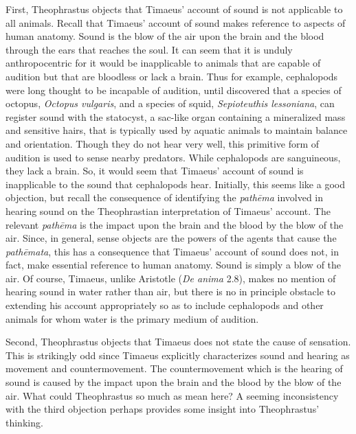 First, Theophrastus objects that Timaeus' account of sound is not applicable to all animals. Recall that Timaeus' account of sound makes reference to aspects of human anatomy. Sound is the blow of the air upon the brain and the blood through the ears that reaches the soul. It can seem that it is unduly anthropocentric for it would be inapplicable to animals that are capable of audition but that are bloodless or lack a brain. Thus for example, cephalopods were long thought to be incapable of audition, until \citet{Hu:2009ov} discovered that a species of octopus, \emph{Octopus vulgaris}, and a species of squid, \emph{Sepioteuthis lessoniana}, can register sound with the statocyst, a sac-like organ containing a mineralized mass and sensitive hairs, that is typically used by aquatic animals to maintain balance and orientation. Though they do not hear very well, this primitive form of audition is used to sense nearby predators. While cephalopods are sanguineous, they lack a brain. So, it would seem that Timaeus' account of sound is inapplicable to the sound that cephalopods hear. Initially, this seems like a good objection, but recall the consequence of identifying the \emph{pathēma} involved in hearing sound on the Theophrastian interpretation of Timaeus' account. The relevant \emph{pathēma} is the impact upon the brain and the blood by the blow of the air. Since, in general, sense objects are the powers of the agents that cause the \emph{pathēmata}, this has a consequence that Timaeus' account of sound does not, in fact, make essential reference to human anatomy. Sound is simply a blow of the air. Of course, Timaeus, unlike Aristotle (\emph{De anima} 2.8), makes no mention of hearing sound in water rather than air, but there is no in principle obstacle to extending his account appropriately so as to include cephalopods and other animals for whom water is the primary medium of audition.

Second, Theophrastus objects that Timaeus does not state the cause of sensation. This is strikingly odd since Timaeus explicitly characterizes sound and hearing as movement and countermovement. The countermovement which is the hearing of sound is caused by the impact upon the brain and the blood by the blow of the air. What could Theophrastus so much as mean here? A seeming inconsistency with the third objection perhaps provides some insight into Theophrastus' thinking.

